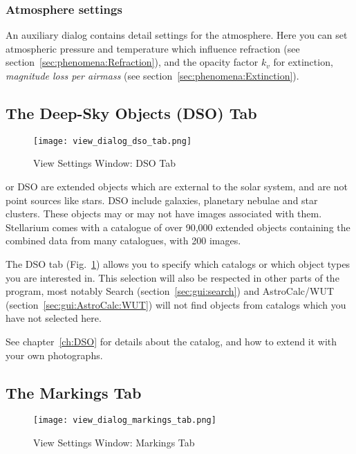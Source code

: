 \subsubsection{Atmosphere settings}
\label{sec:gui:view:sky:atmosphere}

An auxiliary dialog contains detail settings for the atmosphere. Here
you can set atmospheric pressure and temperature which influence
refraction (see section~\ref{sec:phenomena:Refraction}), and the
opacity factor $k_v$ for extinction, \emph{magnitude loss per airmass} 
(see section~\ref{sec:phenomena:Extinction}).


\subsection{The Deep-Sky Objects (DSO) Tab}
\label{sec:gui:view:dso}

\begin{figure}[t]
\texttt{[image: view\_dialog\_dso\_tab.png]}
\caption{View Settings Window: DSO Tab}
\label{fig:gui:view:dso}
\end{figure}

 or DSO are extended objects which are
external to the solar system, and are not point sources like stars.
DSO include galaxies, planetary nebulae and star clusters. These
objects may or may not have images associated with them. Stellarium
comes with a catalogue of over 90,000 extended objects containing
the combined data from many catalogues, with 200 images.  

The DSO tab (Fig.~\ref{fig:gui:view:dso}) allows you to specify which 
catalogs or which object types you are interested in. This selection 
will also be respected in other parts of the program, 
most notably Search (section~\ref{sec:gui:search}) and 
AstroCalc/WUT (section~\ref{sec:gui:AstroCalc:WUT}) 
will not find objects from catalogs which you have not selected here. 

See chapter~\ref{ch:DSO} for details about the catalog, 
and how to extend it with your own photographs.


\subsection{The Markings Tab}
\label{sec:gui:view:markings}

\begin{figure}[t]
\centering\texttt{[image: view\_dialog\_markings\_tab.png]}
\caption{View Settings Window: Markings Tab}
\label{fig:gui:view:markings}
\end{figure}

